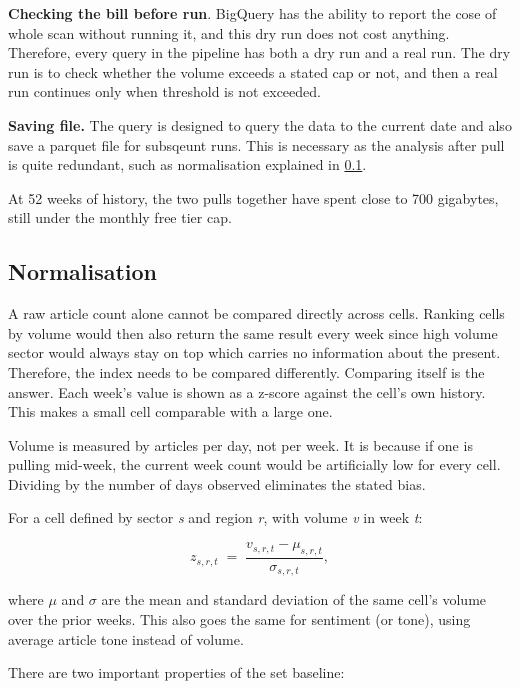 \documentclass[ %
                    author={Natchalin Iwsakul \\ Inkaphol Siriwongwattana \\ Tanaphan Kummaraphat \\ Patorn Srisupap},
                supervisor={Fernando Moreno-Pino},
                    degree={MSc},
                     title={Propensity Modelling for SME Commercial Lending Using Open Public Data},
                  subtitle={Companies House filings and GDELT media coverage as predictors of first-time borrowing},
                      type={},
                      year={2026}]{dissertation}
\begin{document}
    \textbf{Checking the bill before run}. BigQuery has the ability to report the cose of whole scan without running it, and this dry run does not cost anything. Therefore, every query in the pipeline has both a dry run and a real run. The dry run is to check whether the volume exceeds a stated cap or not, and then a real run continues only when threshold is not exceeded.
    
    \textbf{Saving file.} The query is designed to query the data to the current date and also save a parquet file for subsqeunt runs. This is necessary as the analysis after pull is quite redundant, such as normalisation explained in \ref{chap:normalisation}.

    At 52 weeks of history, the two pulls together have spent close to 700 gigabytes, still under the monthly free tier cap.
        
  \subsection{Normalisation}
  \label{chap:normalisation}

    A raw article count alone cannot be compared directly across cells. Ranking cells by volume would then also return the same result every week since high volume sector would always stay on top which carries no information about the present. Therefore, the index needs to be compared differently. Comparing itself is the answer. Each week's value is shown as a z-score against the cell's own history. This makes a small cell comparable with a large one.

    Volume is measured by articles per day, not per week. It is because if one is pulling mid-week, the current week count would be artificially low for every cell. Dividing by the number of days observed eliminates the stated bias.

    For a cell defined by sector \textit{s} and region \textit{r}, with volume \textit{v} in week \textit{t}:

    \begin{equation}
      z_{s,r,t} \;=\; \frac{v_{s,r,t} - \mu_{s,r,t}}{\sigma_{s,r,t}} ,
      \label{eq:zscore}
    \end{equation}

    where $\mu$ and $\sigma$ are the mean and standard deviation of the same cell's volume over the prior weeks. This also goes the same for sentiment (or tone), using average article tone instead of volume.

    There are two important properties of the set baseline:
\end{document}

